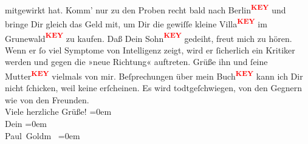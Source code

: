 \begin{ledgroupsized}[t]{13cm}
                    mitgewirkt hat. Komm’ nur zu den Proben recht bald nach Berlin\textcolor{red}{\textsuperscript{\textbf{KEY}}} und {\pb} bringe Dir gleich das
                    Geld mit, um Dir die gewiſſe  kleine Villa\textcolor{red}{\textsuperscript{\textbf{KEY}}} im Grunewald\textcolor{red}{\textsuperscript{\textbf{KEY}}} zu kaufen. \pend
           \pstart
           Daß Dein Sohn\textcolor{red}{\textsuperscript{\textbf{KEY}}} gedeiht, freut mich zu hören. Wenn er
                    ſo viel Symptome von Intelligenz zeigt, wird er ſicherlich ein Kritiker werden
                    und gegen die »neue Richtung« auftreten. Grüße ihn und ſeine Mutter\textcolor{red}{\textsuperscript{\textbf{KEY}}} vielmals von mir. \pend
           \pstart
           Beſprechungen über mein Buch\textcolor{red}{\textsuperscript{\textbf{KEY}}} kann ich Dir nicht
                        {\pb} ſchicken, weil keine erſcheinen. Es wird
                    todtgeſchwiegen, von den Gegnern wie von den Freunden. {\\[\baselineskip]}Viele herzliche
                    Grüße!\pend
           \leftskip=0em{}\pstart
           {\\[\baselineskip]}Dein\pend
           \leftskip=0em{}\pstart
           {\\[\baselineskip]}\spacefill\mbox{Paul Goldm }\pend
           \leftskip=0em{}
         
         \endnumbering{}\end{ledgroupsized}\begin{anhang}\end{anhang}\newcommand{\dateiname}{L03228}\newcommand{\titel}{Paul Goldmann an Arthur Schnitzler, 26. 10. [1902]}\newcommand{\editorInnen}{Martin Anton Müller und Laura Untner}
      